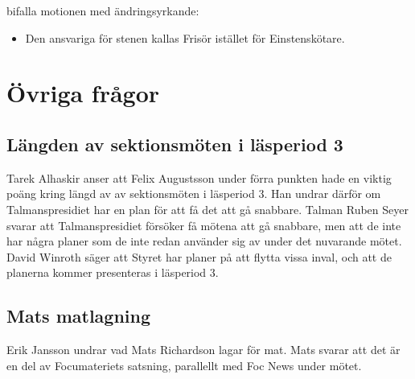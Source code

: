 \documentclass[hidelinks]{sektionsmote} %
\begin{document}
\begin{beslut}
  \item bifalla motionen med ändringsyrkande:
  \begin{itemize}
    \item Den ansvariga för stenen kallas Frisör istället för Einstenskötare.
  \end{itemize}
\end{beslut}

\section{Övriga frågor}
\subsection{Längden av sektionsmöten i läsperiod 3}
Tarek Alhaskir anser att Felix Augustsson under förra punkten hade en viktig poäng kring längd av av sektionsmöten i läsperiod 3.
Han undrar därför om Talmanspresidiet har en plan för att få det att gå snabbare.
Talman Ruben Seyer svarar att Talmanspresidiet försöker få mötena att gå snabbare, men att de inte har några planer som de inte redan använder sig av under det nuvarande mötet.
David Winroth säger att Styret har planer på att flytta vissa inval, och att de planerna kommer presenteras i läsperiod 3.

\subsection{Mats matlagning}
Erik Jansson undrar vad  Mats Richardson lagar för mat.
Mats svarar att det är en del av Focumateriets satsning, parallellt med Foc News under mötet.
\end{document}
